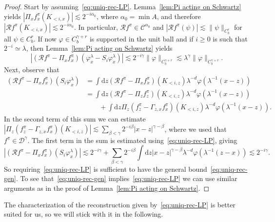 \documentclass[11pt,a4paper]{article}
\newcommand{\mathd}{\mathrm{d}}
\theoremstyle{remark}
\newcommand{\CC}{\ensuremath{\mathscr{C}}}
\begin{document}
\begin{proof}
  Start by assuming~\eqref{eq:uniq-rec-LP}. Lemma~\ref{lem:Pi acting on Schwartz} yields $|\Pi_{x} f^{\pi}_{x} (K_{< i,x} )| \lesssim 2^{-i \alpha_0}$, where $\alpha_0 = \min A$, and therefore $| \mathcal{R}f^{\pi} ( K_{< i,x} ) | \lesssim 2^{-i \alpha_0}$. In particular, $\mathcal R f^\pi \in \CC^{\alpha_0}$ and $|\mathcal R f^\pi (\psi)| \lesssim \|\psi\|_{C^r_b}$ for all $\psi \in C^r_b$. If now $\varphi \in C_b^{\gamma+r}$ is supported in the unit ball and if $i \geqslant 0$ is such that $2^{-i}\simeq \lambda$, then Lemma~\ref{lem:Pi acting on Schwartz} yields
  \[
     | ( \mathcal{R}f^{\pi} - \Pi_{x} f^{\pi}_{x} ) ( \varphi^{\lambda}_{x} - S_i \varphi^{\lambda}_{x} ) | \lesssim 2^{-i \gamma} \|\varphi\|_{C^{\gamma+r}_b} \lesssim \lambda^{\gamma} \|\varphi\|_{C^{\gamma+r}_b}.
  \]
  Next, observe that
  \begin{align*}
     ( \mathcal{R}f^{\pi} - \Pi_{x} f^{\pi}_{x} ) ( S_i \varphi^{\lambda}_{x} ) &= \int \mathd z ( \mathcal{R}f^{\pi} - \Pi_{x} f^{\pi}_{x} ) ( K_{< i,z} ) \lambda^{-d} \varphi ( \lambda^{-1} ( x-z ) ) \\
     & = \int \mathd z ( \mathcal{R}f^{\pi} - \Pi_{z} f^{\pi}_{z} ) ( K_{< i,z} ) \lambda^{-d} \varphi ( \lambda^{-1} ( x-z ) ) \\
     &\qquad + \int \mathd z \Pi_{z} ( f^{\pi}_{z} - \Gamma_{z,x} f^{\pi}_{x} ) (K_{< i,z} ) \lambda^{-d} \varphi ( \lambda^{-1} ( x-z ) ).
  \end{align*}
  In the second term of this sum we can estimate $| \Pi_{z} ( f^{\pi}_{z} - \Gamma_{z,x} f^{\pi}_{x} ) ( K_{< i,z} ) | \lesssim \sum_{\beta < \gamma} 2^{-i \beta} | x-z |^{\gamma - \beta}$, where we used that $f^{\pi} \in \mathcal{D}^{\gamma}$. The first term in the sum is estimated using~{\eqref{eq:uniq-rec-LP}}, giving
  \[
     |( \mathcal{R}f^{\pi} - \Pi_{x} f^{\pi}_{x} ) ( S_i \varphi^{\lambda}_{x} )| \lesssim 2^{-i \gamma} + \sum_{\beta < \gamma}  2^{-i \beta} \int \mathd z | x-z |^{\gamma - \beta} \lambda^{-d} \varphi     ( \lambda^{-1} ( z-x ) ) \lesssim 2^{-i \gamma}.
  \]
  So requiring~{\eqref{eq:uniq-rec-LP}} is sufficient to have the general
  bound~{\eqref{eq:uniq-rec-gen}}. To see that~{\eqref{eq:uniq-rec-gen}} implies~{\eqref{eq:uniq-rec-LP}} we can use similar arguments as in the proof of Lemma~\ref{lem:Pi acting on Schwartz}.
\end{proof}

The characterization of the reconstruction given by~{\eqref{eq:uniq-rec-LP}}
is better suited for us, so we will stick with it in the following.
\end{document}
